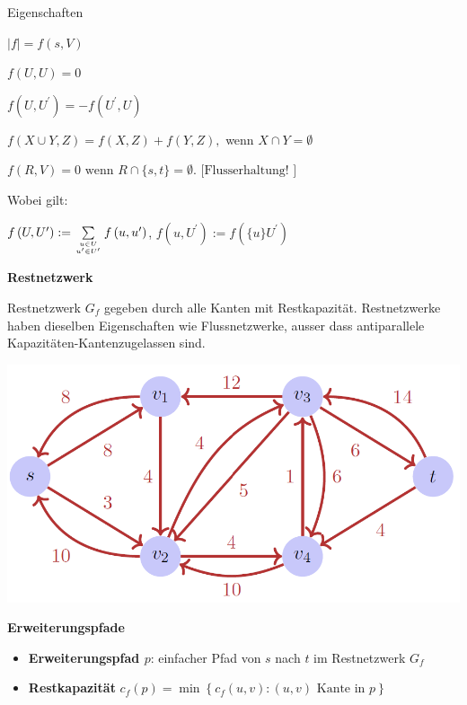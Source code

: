 \vspace{-4pt}
\begin{sectionbox}
\begin{cookbox}{Eigenschaften}
\item $|f|=f(s, V)$
\item $f(U, U)=0$
\item $f\left(U, U^{\prime}\right)=-f\left(U^{\prime}, U\right)$
\item $f(X \cup Y, Z)=f(X, Z)+f(Y, Z),$ wenn $X \cap Y=\emptyset$
\item $f(R, V)=0 \text { wenn } R \cap\{s, t\}=\emptyset . \text { [Flusserhaltung! }]$\smallskip
\par Wobei gilt:
\par $f\left(U, U^{\prime}\right):=\sum\limits_{u \in U \atop u^{\prime} \in U^{\prime}} f\left(u, u^{\prime}\right)$, $f\left(u, U^{\prime}\right):=f\left(\{u\}U^{\prime}\right)$
\end{cookbox}\medskip
\end{sectionbox}
\vspace{-4pt}
\begin{sectionbox}
\textbf{Restnetzwerk}\par
Restnetzwerk $G_{f}$ gegeben durch alle Kanten mit Restkapazität. Restnetzwerke haben dieselben Eigenschaften wie Flussnetzwerke, ausser dass antiparallele Kapazitäten-Kantenzugelassen sind.\par\smallskip
\begin{center}
    \includegraphics[width = 0.9\columnwidth]{../img/restNet.png}
\end{center}\par\smallskip

\textbf{Erweiterungspfade}\par
\begin{itemize}
    \item \textbf{Erweiterungspfad $p$}: einfacher Pfad von $s$ nach $t$ im Restnetzwerk $G_{f}$
    \item \textbf{Restkapazität} $c_{f}(p)=\min \left\{c_{f}(u, v):(u, v) \text { Kante in } p\right\}$
\end{itemize}

\end{sectionbox}
